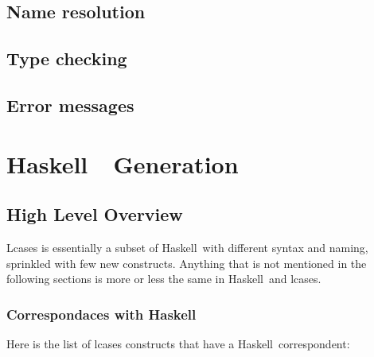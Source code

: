 \documentclass{article}
\def\H{Haskell}
\begin{document}
\subsection{Name resolution}

\subsection{Type checking}

\subsection{Error messages}

\section{\H\ \ Generation}

\subsection{High Level Overview}

Lcases is essentially a subset of \H\ with different syntax and naming,
sprinkled with few new constructs. Anything that is not mentioned in the
following sections is more or less the same in \H\ and lcases.

\subsubsection{Correspondaces with \H}

Here is the list of lcases constructs that have a \H\ correspondent:
\end{document}
